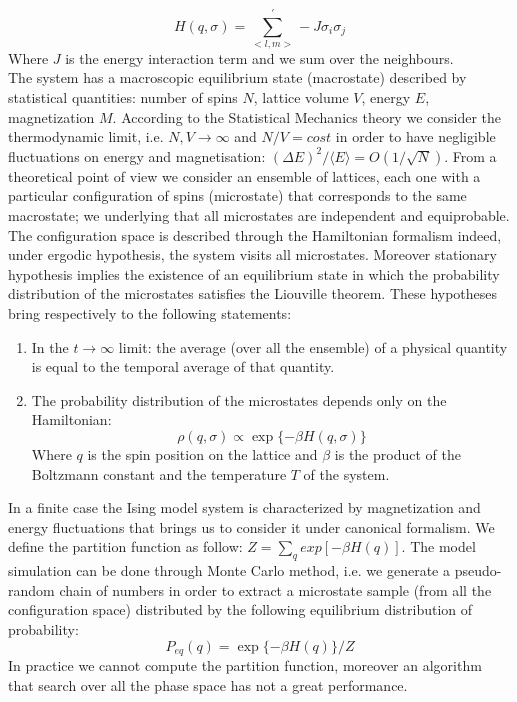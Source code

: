 \documentclass[11pt,a4paper]{article}
\begin{document}
\begin{equation}
H(q, \sigma) = \sum_{<l,m>}^{'} -J\sigma_i\sigma_j 
\end{equation}
Where $J$ is the energy interaction term and we sum over the neighbours.
\\
The system has  a macroscopic equilibrium state (macrostate) described by statistical quantities: number of spins $N$, lattice volume $V$, energy $E$, magnetization $M$. According to the Statistical Mechanics theory we consider the thermodynamic limit, i.e. $N, V \rightarrow \infty$ and $N/V = cost$ in order to have negligible fluctuations on energy and magnetisation: $(\Delta E)^2 / \langle E \rangle = O  (1/ \sqrt{N}) $.
From a theoretical point of view we consider an ensemble of lattices, each one with a particular configuration of spins (microstate) that corresponds to the same macrostate; we underlying that all microstates are independent and equiprobable. The configuration space is described through the Hamiltonian formalism indeed, under ergodic hypothesis, the system visits all microstates. Moreover stationary hypothesis implies the existence of an equilibrium state in which  the probability distribution of the microstates satisfies the Liouville theorem. These hypotheses bring respectively to the following statements:

\begin{enumerate}
\item In the $t \rightarrow \infty$ limit: the average (over all the ensemble) of a physical quantity is equal to the temporal average of that quantity.
\item The probability distribution of the microstates depends only on the Hamiltonian:
\begin{equation}
\rho (q, \sigma ) \propto \exp \lbrace- \beta H(q, \sigma ) \rbrace 
\end{equation}
Where $q$ is the spin position on the lattice and $\beta$ is the product of the Boltzmann constant and the temperature $T$ of the system.
\end{enumerate}


In a finite case the Ising model system is characterized by magnetization and  energy fluctuations that brings us to consider it under canonical formalism. We define the partition function as follow: $Z = \sum_q exp [  -\beta H(q) ]$. The model simulation can be done through Monte Carlo method, i.e. we generate a pseudo-random chain of numbers in order to extract a microstate sample (from all the configuration space) distributed by the following equilibrium distribution of probability:
\begin{equation}
P_{eq}(q)=\exp \lbrace -\beta H(q)\rbrace /Z
\end{equation} 
In practice we cannot compute the partition function, moreover an algorithm that search over all the phase space has not a great performance. 
\end{document}
